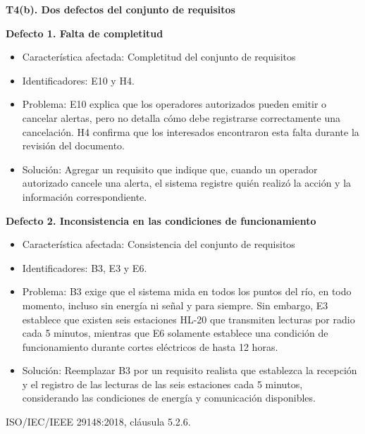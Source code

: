 \documentclass[11pt,a4paper]{article}
\begin{document}
\textbf{T4(b). Dos defectos del conjunto de requisitos}

\textbf{Defecto 1. Falta de completitud}

\begin{itemize}
\item Característica afectada: Completitud del conjunto de requisitos
\item Identificadores: E10 y H4.
\item Problema: E10 explica que los operadores autorizados pueden emitir o cancelar alertas, pero no detalla cómo debe registrarse correctamente una cancelación. H4 confirma que los interesados encontraron esta falta durante la revisión del documento.
\item Solución: Agregar un requisito que indique que, cuando un operador autorizado cancele una alerta, el sistema registre quién realizó la acción y la información correspondiente.
\end{itemize}

\textbf{Defecto 2. Inconsistencia en las condiciones de funcionamiento}

\begin{itemize}
\item Característica afectada: Consistencia del conjunto de requisitos
\item Identificadores: B3, E3 y E6.
\item Problema: B3 exige que el sistema mida en todos los puntos del río, en todo momento, incluso sin energía ni señal y para siempre. Sin embargo, E3 establece que existen seis estaciones HL-20 que transmiten lecturas por radio cada 5 minutos, mientras que E6 solamente establece una condición de funcionamiento durante cortes eléctricos de hasta 12 horas.
\item Solución: Reemplazar B3 por un requisito realista que establezca la recepción y el registro de las lecturas de las seis estaciones cada 5 minutos, considerando las condiciones de energía y comunicación disponibles.
\end{itemize}

ISO/IEC/IEEE 29148:2018, cláusula 5.2.6.
\end{document}
